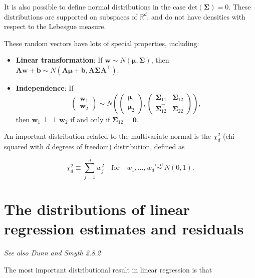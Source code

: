 \documentclass[
  11pt,
  letterpaper,
  oneside]{book}
\providecommand{\tightlist}{%
  \setlength{\itemsep}{0pt}\setlength{\parskip}{0pt}}\usepackage{longtable,booktabs,array}
\theoremstyle{plain}
\theoremstyle{plain}
\theoremstyle{definition}
\theoremstyle{definition}
\theoremstyle{plain}
\theoremstyle{remark}
\begin{document}
It is also possible to define normal distributions in the case
\(\text{det}(\boldsymbol\Sigma) = 0\). These distributions are supported
on subspaces of \(\mathbb{R}^d\), and do not have densities with respect
to the Lebesgue measure.

These random vectors have lots of special properties, including:

\begin{itemize}
\tightlist
\item
  \textbf{Linear transformation}: If
  \(\boldsymbol{w} \sim N(\boldsymbol{\mu}, \boldsymbol{\Sigma})\), then
  \(\boldsymbol{A} \boldsymbol{w} + \boldsymbol{b} \sim N(\boldsymbol{A} \boldsymbol{\mu} + \boldsymbol{b}, \boldsymbol{A} \boldsymbol{\Sigma} \boldsymbol{A}^\top)\).
\item
  \textbf{Independence}: If \[
  \begin{pmatrix}\boldsymbol{w}_1 \\ \boldsymbol{w}_2 \end{pmatrix} \sim N\left(\begin{pmatrix}\boldsymbol{\mu}_1 \\ \boldsymbol{\mu}_2 \end{pmatrix} , \begin{pmatrix}\boldsymbol{\Sigma}_{11} & \boldsymbol{\Sigma}_{12} \\ \boldsymbol{\Sigma}_{12}^\top & \boldsymbol{\Sigma}_{22}\end{pmatrix}\right),
  \] then \(\boldsymbol{w}_1 \perp\!\!\!\perp \boldsymbol{w}_2\) if and
  only if \(\boldsymbol{\Sigma}_{12} = \boldsymbol{0}\).
\end{itemize}

An important distribution related to the multivariate normal is the
\(\chi^2_d\) (chi-squared with \(d\) degrees of freedom) distribution,
defined as

\[
\chi^2_d \equiv \sum_{j = 1}^d w_j^2 \quad \text{for} \quad w_1, \dots, w_d \overset{\text{i.i.d.}}{\sim} N(0, 1).
\]

\hypertarget{sec-lin-reg-dist}{%
\section{The distributions of linear regression estimates and
residuals}\label{sec-lin-reg-dist}}

\emph{See also Dunn and Smyth 2.8.2}

The most important distributional result in linear regression is that
\end{document}
